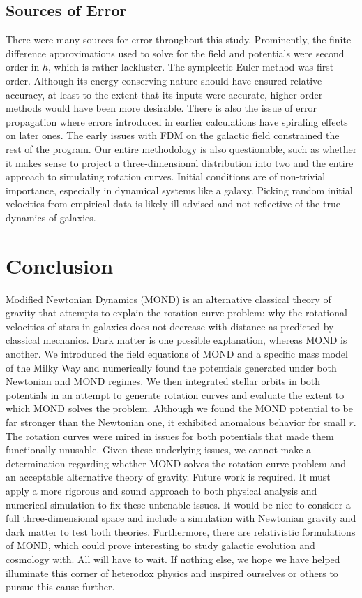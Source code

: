 \documentclass[11pt, twocolumn]{article}
\begin{document}
    \subsection*{Sources of Error}
    There were many sources for error throughout this study. Prominently, the finite difference approximations used to solve for the field and potentials were second order in $h$, which is rather lackluster. The symplectic Euler method was first order. Although its energy-conserving nature should have ensured relative accuracy, at least to the extent that its inputs were accurate, higher-order methods would have been more desirable. There is also the issue of error propagation where errors introduced in earlier calculations have spiraling effects on later ones. The early issues with FDM on the galactic field constrained the rest of the program. Our entire methodology is also questionable, such as whether it makes sense to project a three-dimensional distribution into two and the entire approach to simulating rotation curves. Initial conditions are of non-trivial importance, especially in dynamical systems like a galaxy. Picking random initial velocities from empirical data is likely ill-advised and not reflective of the true dynamics of galaxies.  

    \section*{Conclusion}
    Modified Newtonian Dynamics (MOND) is an alternative classical theory of gravity that attempts to explain the rotation curve problem: why the rotational velocities of stars in galaxies does not decrease with distance as predicted by classical mechanics. Dark matter is one possible explanation, whereas MOND is another. We introduced the field equations of MOND and a specific mass model of the Milky Way and numerically found the potentials generated under both Newtonian and MOND regimes. We then integrated stellar orbits in both potentials in an attempt to generate rotation curves and evaluate the extent to which MOND solves the problem. Although we found the MOND potential to be far stronger than the Newtonian one, it exhibited anomalous behavior for small $r$. The rotation curves were mired in issues for both potentials that made them functionally unusable. Given these underlying issues, we cannot make a determination regarding whether MOND solves the rotation curve problem and an acceptable alternative theory of gravity. Future work is required. It must apply a more rigorous and sound approach to both physical analysis and numerical simulation to fix these untenable issues. It would be nice to consider a full three-dimensional space and include a simulation with Newtonian gravity and dark matter to test both theories. Furthermore, there are relativistic formulations of MOND, which could prove interesting to study galactic evolution and cosmology with. All will have to wait. If nothing else, we hope we have helped illuminate this corner of heterodox physics and inspired ourselves or others to pursue this cause further.
    
\end{document}
